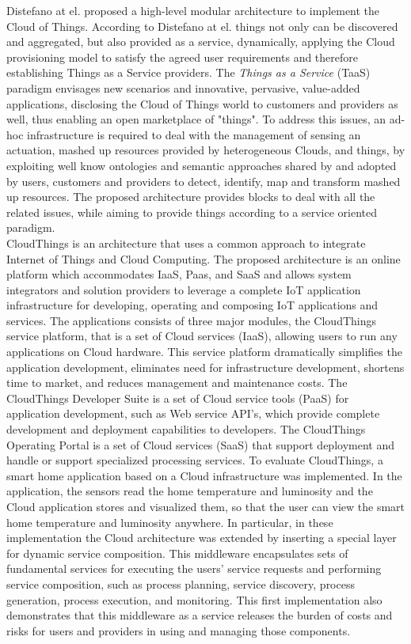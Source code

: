 Distefano \cite{distefano2012enabling} at el. proposed a high-level modular architecture to implement the Cloud of Things. According to Distefano at el. things
not only can be discovered and aggregated, but also provided as a service, dynamically, applying the Cloud provisioning model to satisfy the agreed
user requirements and therefore establishing Things as a Service providers. The \textit{Things as a Service} (TaaS) paradigm envisages new scenarios
and innovative, pervasive, value-added applications, disclosing the Cloud of Things world to customers and providers as well, thus enabling an open
marketplace of "things". To address this issues, an ad-hoc infrastructure is required to deal with the management of sensing an actuation, mashed up
resources provided by heterogeneous Clouds, and things, by exploiting well know ontologies and semantic approaches shared by and adopted by users,
customers and providers to detect, identify, map and transform mashed up resources. The proposed architecture provides blocks to deal with all the
related issues, while aiming to provide things according to a service oriented paradigm.\\

CloudThings \cite{zhou2013cloudthings} is an architecture that uses a common approach to integrate Internet of Things and Cloud Computing. The proposed architecture
is an online platform which accommodates IaaS, Paas, and SaaS and allows system integrators and solution providers to leverage a complete IoT application
infrastructure for developing, operating and composing IoT applications and services. The applications consists of three major modules, the CloudThings
service platform, that is a set of Cloud services (IaaS), allowing users to run any applications on Cloud hardware. This service platform dramatically
simplifies the application development, eliminates need for infrastructure development, shortens time to market, and reduces management and maintenance
costs. The CloudThings Developer Suite is a set of Cloud service tools (PaaS) for application development, such as Web service API's, which provide complete
development and deployment capabilities to developers. The CloudThings Operating Portal is a set of Cloud services (SaaS) that support deployment and handle
or support specialized processing services. To evaluate CloudThings, a smart home application based on a Cloud infrastructure was implemented. In the application,
the sensors read the home temperature and luminosity and the Cloud application stores and visualized them, so that the user can view the smart home temperature and luminosity
anywhere. In particular, in these implementation the Cloud architecture was extended by inserting a special layer for dynamic service composition.
This middleware encapsulates sets of fundamental services for executing the users’ service requests and performing service composition, such as process planning,
service discovery, process generation, process execution, and monitoring. This first implementation also demonstrates that this middleware as a service
releases the burden of costs and risks for users and providers in using and managing those components.\\

